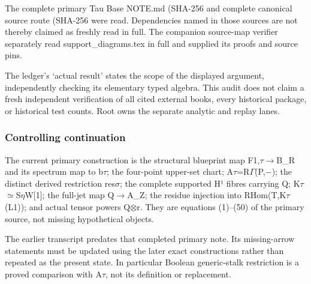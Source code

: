 The complete primary Tau Base NOTE.md (SHA-256
\protect{}
and complete canonical source route (SHA-256
\protect{}
were read. Dependencies named in those sources are not thereby claimed
as freshly read in full. The companion source-map verifier separately
read support\_diagrams.tex in full and supplied its proofs and source
pins.

The ledger's `actual result' states the scope of the displayed argument,
independently checking its elementary typed algebra. This audit does not
claim a fresh independent verification of all cited external books,
every historical package, or historical test counts. Root owns the
separate analytic and replay lanes.

\subsubsection{Controlling continuation}\label{controlling-continuation}

The current primary construction is the structural blueprint map
F1,\allowbreak{}\ensuremath{τ}\allowbreak{}\allowbreak{}\ensuremath{→}\allowbreak{}B\_R
and its spectrum map to b\allowbreak{}\ensuremath{τ}\allowbreak{}; the
four-point upper-set chart;
A\allowbreak{}\ensuremath{τ}\allowbreak{}=R\allowbreak{}\ensuremath{Γ}\allowbreak{}(P,\allowbreak{}\ensuremath{−}\allowbreak{});
the distinct derived restriction
res\allowbreak{}\ensuremath{σ}\allowbreak{}; the complete supported H¹
fibres carrying Q;
K\allowbreak{}\ensuremath{τ}\allowbreak{}\allowbreak{}\ensuremath{≃}\allowbreak{}S\allowbreak{}\ensuremath{η}\allowbreak{}W[1];
the full-jet map Q\allowbreak{}\ensuremath{→}\allowbreak{}A\_Z; the
residue injection into
RHom(T,K\allowbreak{}\ensuremath{τ}\allowbreak{}(L1)); and actual tensor
powers Q\allowbreak{}\ensuremath{⊗}\allowbreak{}r. They are equations
(1)--(50) of the primary source, not missing hypothetical objects.

The earlier transcript predates that completed primary note. Its
missing-arrow statements must be updated using the later exact
constructions rather than repeated as the present state. In particular
Boolean generic-stalk restriction is a proved comparison with
A\allowbreak{}\ensuremath{τ}\allowbreak{}, not its definition or
replacement.


